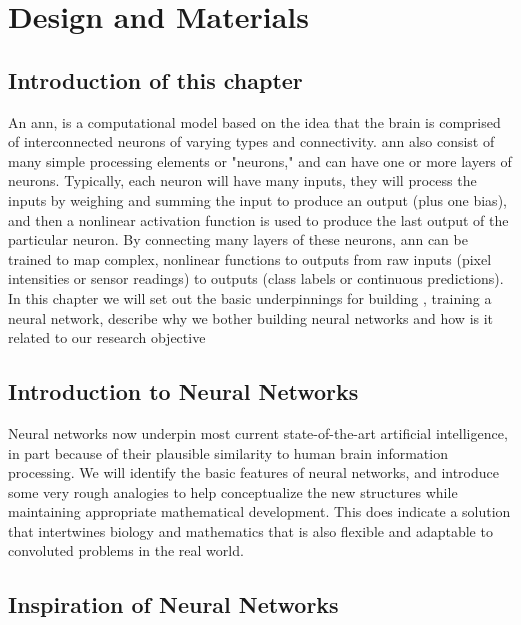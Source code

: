 \chapter{Design and Materials}
\label{chap:design}
\section{Introduction of this chapter}
An \gls{ann}, is a computational model based on the idea that the brain is comprised of interconnected neurons of varying types and connectivity. \gls{ann} also consist of many simple processing elements or "neurons," and can have one or more layers of neurons. Typically, each neuron will have many inputs, they will process the inputs by weighing and summing the input to produce an output (plus one bias), and then a nonlinear activation function is used to produce the last output of the particular neuron. By connecting many layers of these neurons, \gls{ann} can be trained to map complex, nonlinear functions to outputs from raw inputs (pixel intensities or sensor readings) to outputs (class labels or continuous predictions). In this chapter we will set out the basic underpinnings for building , training a neural network, describe why we bother building neural networks and how is it related to our research objective





\section{Introduction to Neural Networks} 
Neural networks now underpin most current state-of-the-art artificial intelligence, in part because of their plausible similarity to human brain information processing. We will identify the basic features of neural networks, and introduce some very rough analogies to help conceptualize the new structures while maintaining appropriate mathematical development. This does indicate a solution that intertwines biology and mathematics that is also flexible and adaptable to convoluted problems in the real world.











\section{Inspiration of Neural Networks}

